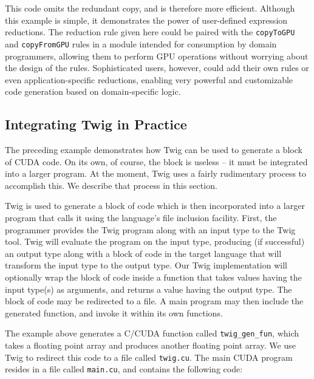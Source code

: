 This code omits the redundant copy, and is therefore more
efficient. Although this example is simple, it demonstrates the
power of user-defined expression reductions. The reduction rule
given here could be paired with the \texttt{copyToGPU} and
\texttt{copyFromGPU} rules in a module intended for consumption by
domain programmers, allowing them to perform GPU operations
without worrying about the design of the rules. Sophisticated
users, however, could add their own rules or even
application-specific reductions, enabling very powerful and
customizable code generation based on domain-specific logic.

\subsection{Integrating Twig in Practice}

The preceding example demonstrates how Twig can be used to generate a block of
CUDA code. On its own, of course, the block is useless -- it must be
integrated into a larger program. At the moment, Twig uses a fairly
rudimentary process to accomplish this. We describe that process in this
section.

Twig is used to generate a block of code which is then incorporated into a
larger program that calls it using the language's file inclusion facility.
First, the programmer provides the Twig program along with an input type to
the Twig tool. Twig will evaluate the program on the input type, producing (if
successful) an output type along with a block of code in the target language
that will transform the input type to the output type. Our Twig implementation
will optionally wrap the block of code inside a function that takes values
having the input type(s) as arguments, and returns a value having the output
type. The block of code may be redirected to a file. A main program may then
include the generated function, and invoke it within its own functions.

The example above generates a C/CUDA function called \texttt{twig\_gen\_fun},
which takes a floating point array and produces another floating point array.
We use Twig to redirect this code to a file called \texttt{twig.cu}. The main
CUDA program resides in a file called \texttt{main.cu}, and contains the
following code:

